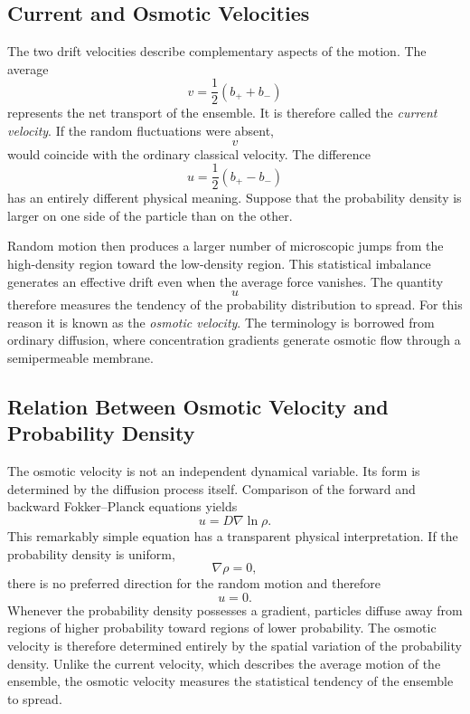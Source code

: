 \subsection{Current and Osmotic Velocities}
The two drift velocities describe complementary aspects of the motion.
The average
\begin{equation}
\boxed{v=\frac12(b_{+}+b_{-})}
\label{eq:currentvelocity}
\end{equation}
represents the net transport of the ensemble.
It is therefore called the
\emph{current velocity}.
If the random fluctuations were absent,
\[v\]
would coincide with the ordinary classical velocity.
The difference
\begin{equation}
\boxed{u=\frac12(b_{+}-b_{-})}
\label{eq:osmoticvelocity}
\end{equation}
has an entirely different physical meaning.
Suppose that the probability density is larger on one side of the
particle than on the other.

Random motion then produces a larger number of microscopic jumps from
the high-density region toward the low-density region.
This statistical imbalance generates an effective drift even when the
average force vanishes.
The quantity
\[u\]
therefore measures the tendency of the probability distribution to
spread.
For this reason it is known as the
\emph{osmotic velocity}.
The terminology is borrowed from ordinary diffusion, where concentration
gradients generate osmotic flow through a semipermeable membrane.
\subsection{Relation Between Osmotic Velocity and Probability Density}
The osmotic velocity is not an independent dynamical variable.
Its form is determined by the diffusion process itself.
Comparison of the forward and backward Fokker--Planck equations yields
\begin{equation}
\boxed{u=D\nabla\ln\rho.}
\label{eq:osmotic}
\end{equation}
This remarkably simple equation has a transparent physical
interpretation.
If the probability density is uniform,
\[\nabla\rho=0,\]
there is no preferred direction for the random motion and therefore
\[u=0.\]
Whenever the probability density possesses a gradient,
particles diffuse away from regions of higher probability toward regions
of lower probability.
The osmotic velocity is therefore determined entirely by the spatial
variation of the probability density.
Unlike the current velocity,
which describes the average motion of the ensemble,
the osmotic velocity measures the statistical tendency of the ensemble
to spread.

